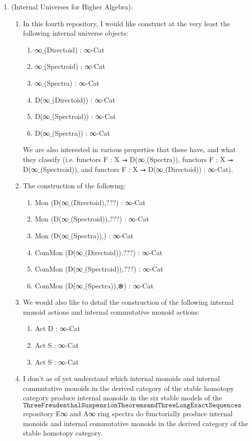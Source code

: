 \documentclass{book}
\begin{document}
\begin{enumerate}
\item (Internal Universes for Higher Algebra):
\begin{enumerate}
\item In this fourth repository, I would like construct at the very least the following internal universe objects:
\begin{enumerate}
\item ∞${}\_$(Directoid) : ∞-Cat
\item ∞${}\_$(Spectroid) : ∞-Cat
\item ∞${}\_$(Spectra) : ∞-Cat
\item D(∞${}\_$(Directoid)) : ∞-Cat
\item D(∞${}\_$(Spectroid)) : ∞-Cat
\item D(∞${}\_$(Spectra)) : ∞-Cat
\end{enumerate}
We are also interested in various properties that these have, and what they classify (i.e. functors F : X ⭢ D(∞${}\_$(Spectra)), functors F : X ⭢ D(∞${}\_$(Spectroid)), and functors F : X ⭢ D(∞${}\_$(Directoid)) : ∞-Cat).
\item The construction of the following:
\begin{enumerate}
\item Mon (D(∞${}\_$(Directoid),???) : ∞-Cat
\item Mon (D(∞${}\_$(Spectroid)),???) : ∞-Cat
\item Mon (D(∞${}\_$(Spectra)),) : ∞-Cat
\item ComMon (D(∞${}\_$(Directoid)),???) : ∞-Cat
\item ComMon (D(∞${}\_$(Spectroid)),???) : ∞-Cat
\item ComMon (D(∞${}\_$(Spectra)),⊗) : ∞-Cat
\end{enumerate}
\item We would also like to detail the construction of the following internal monoid actions and internal commutative monoid actions:
\begin{enumerate}
\item Act D : ∞-Cat
\item Act S : ∞-Cat
\item Act S : ∞-Cat
\end{enumerate}
\item I don't as of yet understand which internal monoids and internal commutative monoids in the derived category of the stable homotopy category produce internal monoids in the six stable models of the $\texttt{ThreeFreudenthalSuspensionTheoremsandThreeLongExactSequences}$ repository E∞ and A∞ ring spectra do functorially produce internal monoids and internal commutative monoids in the derived category of the stable homotopy category.

\end{enumerate}
\end{enumerate}
\end{document}

